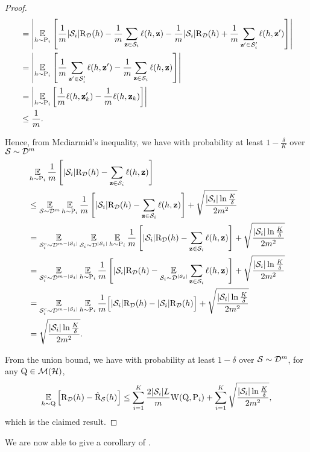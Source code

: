 \begin{noaddcontents}
\begin{proof}
\begin{align*}
    &= \LN \EE_{h\sim\P_i} \LB \frac{1}{m}|\S_i|\Risk_{\D}(h) - \frac{1}{m}\sum_{\z\in\S_i} \loss(h, \z) - \frac{1}{m}|\S_i|\Risk_{\D}(h) + \frac{1}{m}\sum_{\z'\in\S'_i} \loss(h, \z')\RB \right\vert\\
    &= \LN \EE_{h\sim\P_i} \LB \frac{1}{m}\sum_{\z'\in\S'_i} \loss(h, \z') - \frac{1}{m}\sum_{\z\in\S_i} \loss(h, \z)\RB \right\vert\\
    &= \LN \EE_{h\sim\P_i} \LB \frac{1}{m}\loss(h, \z'_k) - \frac{1}{m}\loss(h, \z_k)\RB \right\vert\\
    &\le \frac{1}{m}.
    \end{align*}
    
    Hence, from Mcdiarmid's inequality, we have with probability at least $1-\frac{\delta}{K}$ over $\S\sim\D^{m}$
    \begin{align*}
    &\EE_{h\sim\P_i} \frac{1}{m}\LB |\S_i|\Risk_{\D}(h) - \sum_{\z\in\S_i} \loss(h, \z) \RB \\ &\le \EE_{\S\sim\D^{m}}\EE_{h\sim\P_i} \frac{1}{m}\LB |\S_i|\Risk_{\D}(h) - \sum_{\z\in\S_i} \loss(h, \z) \RB + \sqrt{\frac{|\S_i|\ln\frac{K}{\delta}}{2m^2}}\\
    &= \EE_{\S^c_i\sim\D^{m-|\S_i|}}\EE_{\S_i\sim\D^{|\S_i|}}\EE_{h\sim\P_i} \frac{1}{m}\LB |\S_i|\Risk_{\D}(h) - \sum_{\z\in\S_i} \loss(h, \z) \RB + \sqrt{\frac{|\S_i|\ln\frac{K}{\delta}}{2m^2}}\\
    &= \EE_{\S^c_i\sim\D^{m-|\S_i|}}\EE_{h\sim\P_i} \frac{1}{m}\LB |\S_i|\Risk_{\D}(h) - \EE_{\S_i\sim\D^{|\S_i|}}\sum_{\z\in\S_i} \loss(h, \z) \RB + \sqrt{\frac{|\S_i|\ln\frac{K}{\delta}}{2m^2}}\\
    &= \EE_{\S^c_i\sim\D^{m-|\S_i|}}\EE_{h\sim\P_i} \frac{1}{m}\Big[ |\S_i|\Risk_{\D}(h) - |\S_i|\Risk_{\D}(h)\Big] + \sqrt{\frac{|\S_i|\ln\frac{K}{\delta}}{2m^2}}\\
    &= \sqrt{\frac{|\S_i|\ln\frac{K}{\delta}}{2m^2}}.
    \end{align*}
    
    From the union bound, we have with probability at least $1-\delta$ over $\S\sim\D^m$, for any $\Q\in\Mcal(\H)$,
    \begin{align*}
    \EE_{h\sim\Q}\Big[ \Risk_{\D}(h) - \Riskhat_{\S}(h) \Big] \le \sum_{i=1}^{K} \frac{2|\S_i|L}{m}\W(\Q, \P_i) + \sum_{i=1}^{K} \sqrt{\frac{|\S_i|\ln\frac{K}{\delta}}{2m^2}},
    \end{align*}
    which is the claimed result.
    \end{proof}
    
    We are now able to give a corollary of .
    

\end{noaddcontents}
